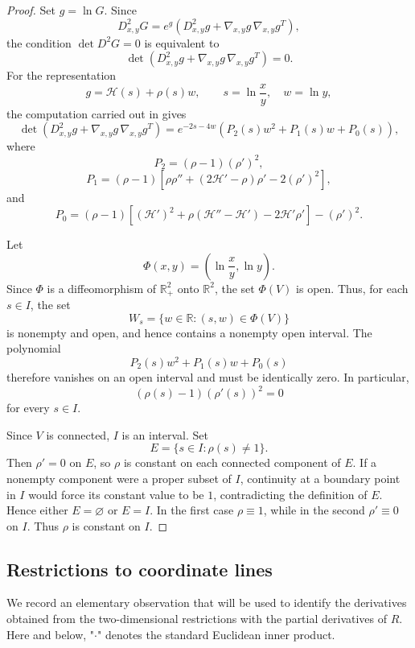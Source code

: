 \documentclass[12pt]{amsart}
\begin{document}
\begin{proof}
Set $g=\ln G$. Since
\[
D^2_{x,y}G
=
e^g\left(
D^2_{x,y}g+\nabla_{x,y}g\,\nabla_{x,y}g^T
\right),
\]
the condition $\det D^2G=0$ is equivalent to
\[
\det\left(
D^2_{x,y}g+\nabla_{x,y}g\,\nabla_{x,y}g^T
\right)=0.
\]
For the representation
\[
g=\mathcal H(s)+\rho(s)w,
\qquad
s=\ln\frac{x}{y},
\quad
w=\ln y,
\]
the computation carried out in \cite{Previous2D} gives
\[
\det\left(
D^2_{x,y}g+\nabla_{x,y}g\,\nabla_{x,y}g^T
\right)
=
e^{-2s-4w}
\left(
P_2(s)w^2+P_1(s)w+P_0(s)
\right),
\]
where
\[
P_2=(\rho-1)(\rho')^2,
\]
\[
P_1
=
(\rho-1)
\left[
\rho\rho''
+(2\mathcal H'-\rho)\rho'
-2(\rho')^2
\right],
\]
and
\[
P_0
=
(\rho-1)
\left[
(\mathcal H')^2
+\rho(\mathcal H''-\mathcal H')
-2\mathcal H'\rho'
\right]
-(\rho')^2.
\]

Let
\[
\Phi(x,y)
=
\left(\ln\frac{x}{y},\ln y\right).
\]
Since $\Phi$ is a diffeomorphism of $\mathbb R_+^2$ onto
$\mathbb R^2$, the set $\Phi(V)$ is open. Thus, for each $s\in I$,
the set
\[
W_s
=
\{w\in\mathbb R:(s,w)\in\Phi(V)\}
\]
is nonempty and open, and hence contains a nonempty open interval.
The polynomial
\[
P_2(s)w^2+P_1(s)w+P_0(s)
\]
therefore vanishes on an open interval and must be identically zero.
In particular,
\[
(\rho(s)-1)(\rho'(s))^2=0
\]
for every $s\in I$.

Since $V$ is connected, $I$ is an interval. Set
\[
E=\{s\in I:\rho(s)\neq1\}.
\]
Then $\rho'=0$ on $E$, so $\rho$ is constant on each connected
component of $E$. If a nonempty component were a proper subset of
$I$, continuity at a boundary point in $I$ would force its constant
value to be $1$, contradicting the definition of $E$. Hence either
$E=\varnothing$ or $E=I$. In the first case $\rho\equiv1$, while in
the second $\rho'\equiv0$ on $I$. Thus $\rho$ is constant on $I$.
\end{proof}




\subsection{Restrictions to coordinate lines}\label{S5.2}

We record an elementary observation that will be used to identify the
derivatives obtained from the two-dimensional restrictions with the
partial derivatives of \(R\). Here and below, "$\cdot$" denotes the standard Euclidean inner product.
\end{document}
